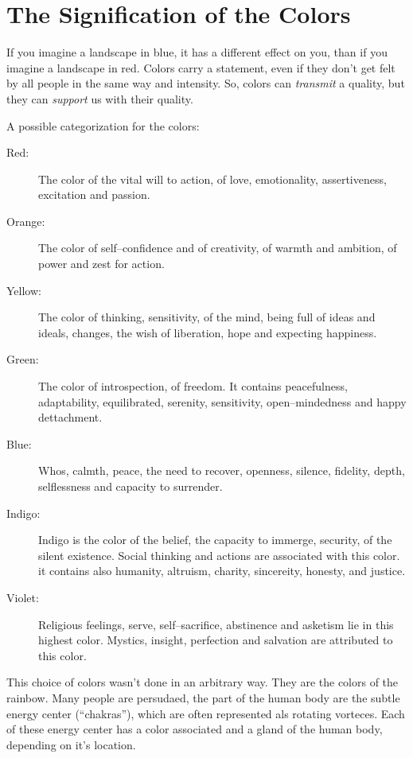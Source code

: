 \documentclass[../main.tex]{subfiles}
\begin{document}


\chapter{The Signification of the Colors}

If you imagine a landscape in blue, it has a different effect on you, than if you imagine a landscape in red. Colors carry a statement, even if they don't get felt by all people in the same way and intensity. So, colors can \emph{transmit} a quality, but they can \emph{support} us with their quality.

A possible categorization for the colors:

\begin{description}
\item[Red:] The color of the vital will to action, of love,  emotionality, assertiveness, excitation and passion.
\item[Orange:] The color of self--confidence and of creativity, of warmth and ambition, of power and zest for action.
\item[Yellow:] The color of thinking, sensitivity, of the mind, being full of ideas and ideals, changes, the wish of liberation, hope and expecting happiness.
\item[Green:] The color of introspection, of freedom. It contains peacefulness, adaptability, equilibrated, serenity, sensitivity, open--mindedness and happy dettachment.
\item[Blue:] Whos, calmth, peace, the need to recover, openness, silence, fidelity, depth, selflessness and capacity to surrender.
\item[Indigo:] Indigo is the color of the belief, the capacity to immerge, security, of the silent existence. Social thinking and actions are associated with this color. it contains also humanity, altruism, charity, sincereity, honesty, and justice. 
  \item[Violet:] Religious feelings, serve, self--sacrifice, abstinence and asketism lie in this highest color. Mystics, insight, perfection and salvation are attributed to this color.
  \end{description}

  This choice of colors wasn't done in an arbitrary way. They are the colors of the rainbow. Many people are persudaed, the part of the human body are the subtle energy center (``chakras''), which are often represented als rotating vorteces. Each of these energy center has a color associated and a gland of the human body, depending on it's location.
\end{document}
